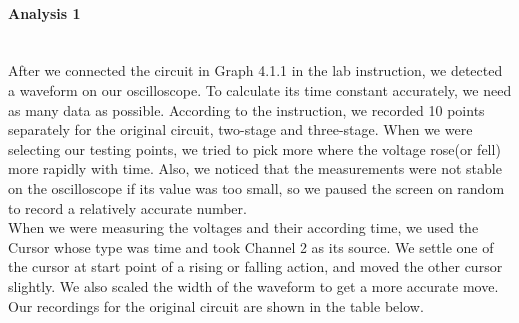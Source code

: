 \paragraph{Analysis 1}\hfill
\\
\phantom{ } After we connected the circuit in Graph 4.1.1 in the lab instruction, we detected a waveform on our oscilloscope. To calculate its time constant accurately, we need as many data as possible. According to the instruction, we recorded 10 points separately for the original circuit, two-stage and three-stage. When we were selecting our testing points, we tried to pick more where the voltage rose(or fell) more rapidly with time. Also, we noticed that the measurements were not stable on the oscilloscope if its value was too small, so we paused the screen on random to record a relatively accurate number.\\
\phantom{ } When we were measuring the voltages and their according time, we used the Cursor whose type was time and took Channel 2 as its source. We settle one of the cursor at start point of a rising or falling action, and moved the other cursor slightly. We also scaled the width of the waveform to get a more accurate move.\\
\phantom{ } Our recordings for the original circuit are shown in the table below.
